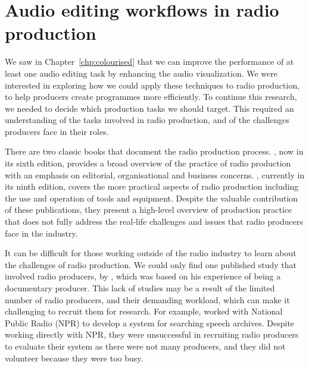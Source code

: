 \chapter{Audio editing workflows in radio production}\label{chp:ethno}


We saw in Chapter~\ref{chp:colourised} that we can improve the performance of at least one audio editing task by
enhancing the audio visualization. We were interested in exploring how we could apply these techniques to radio
production, to help producers create programmes more efficiently.  To continue this research, we needed to decide which
production tasks we should target. This required an understanding of the tasks involved in radio production, and of the
challenges producers face in their roles.



There are two classic books that document the radio production process. \citet{McLeish2015}, now in its sixth edition,
provides a broad overview of the practice of radio production with an emphasis on editorial, organisational and
business concerns.  \citet{Hausman2012}, currently in its ninth edition, covers the more practical aspects of radio
production including the use and operation of tools and equipment.  Despite the valuable contribution of these
publications, they present a high-level overview of production practice that does not fully address the real-life
challenges and issues that radio producers face in the industry.

It can be difficult for those working outside of the radio industry to learn about the challenges of radio production.
We could only find one published study that involved radio producers, by \citet{Dunaway2000}, which was based on his
experience of being a documentary producer. This lack of studies may be a result of the limited number of radio
producers, and their demanding workload, which can make it challenging to recruit them for research.  For example,
\citet{Kim2003} worked with National Public Radio (NPR) to develop a system for searching speech archives.  Despite
working directly with NPR, they were unsuccessful in recruiting radio producers to evaluate their system as there were
not many producers, and they did not volunteer because they were too busy.

